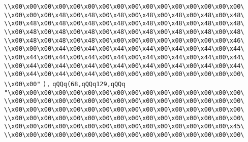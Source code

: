 \verb|\\x00\x00\x00\x00\x00\x00\x00\x00\x00\x00\x00\x00\x00\x00\x00\x00\|\newline
\verb|\\x00\x00\x00\x48\x00\x48\x00\x48\x00\x48\x00\x48\x00\x48\x00\x48\|\newline
\verb|\\x00\x48\x00\x48\x00\x48\x00\x48\x00\x48\x00\x48\x00\x48\x00\x48\|\newline
\verb|\\x00\x48\x00\x48\x00\x48\x00\x48\x00\x48\x00\x48\x00\x48\x00\x48\|\newline
\verb|\\x00\x48\x00\x48\x00\x48\x00\x00\x00\x00\x00\x00\x00\x00\x00\x46\|\newline
\verb|\\x00\x00\x00\x44\x00\x44\x00\x44\x00\x44\x00\x44\x00\x44\x00\x44\|\newline
\verb|\\x00\x44\x00\x44\x00\x44\x00\x44\x00\x44\x00\x44\x00\x44\x00\x44\|\newline
\verb|\\x00\x44\x00\x44\x00\x44\x00\x44\x00\x44\x00\x44\x00\x44\x00\x44\|\newline
\verb|\\x00\x44\x00\x44\x00\x44\x00\x00\x00\x00\x00\x00\x00\x00\x00\x00\|\newline
\verb|\\x00\x00"|\newline
\verb|),|\newline
\verb|qQQq(68,qQQq129,qQQq|\newline
\verb|"\x00\x00\x00\x00\x00\x00\x00\x00\x00\x00\x00\x00\x00\x00\x00\x00\|\newline
\verb|\\x00\x00\x00\x00\x00\x00\x00\x00\x00\x00\x00\x00\x00\x00\x00\x00\|\newline
\verb|\\x00\x00\x00\x00\x00\x00\x00\x00\x00\x00\x00\x00\x00\x00\x00\x00\|\newline
\verb|\\x00\x00\x00\x00\x00\x00\x00\x00\x00\x00\x00\x00\x00\x00\x00\x00\|\newline
\verb|\\x00\x00\x00\x00\x00\x00\x00\x00\x00\x00\x00\x00\x00\x00\x00\x45\|\newline
\verb|\\x00\x00\x00\x00\x00\x00\x00\x00\x00\x00\x00\x00\x00\x00\x00\x00\|\newline
